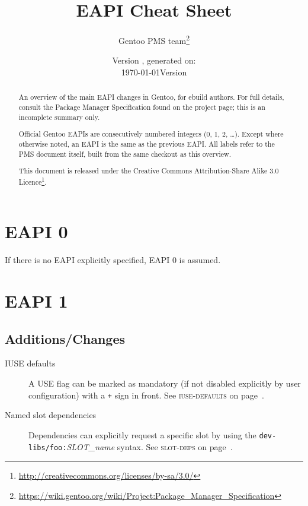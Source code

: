 \documentclass[a4paper]{leaflet}
\title{EAPI Cheat Sheet}
\author{Gentoo PMS team\thanks{%
    \url{https://wiki.gentoo.org/wiki/Project:Package_Manager_Specification}}}
\date{Version \version{}, generated on: \\\today}
\date{Version \version\\\printdate{\VCDateISO}}
\newcommand{\code}[1]{\texttt{#1}}
\newcommand{\featureref}[1]{\textsc{#1} on page~\pageref{feat:#1}}
\begin{document}
\maketitle
\thispagestyle{empty}
\begin{abstract}
    An overview of the main EAPI changes in Gentoo, for ebuild
    authors.  For full details, consult the Package Manager
    Specification found on the project page; this is
    an incomplete summary only.

    Official Gentoo EAPIs are consecutively numbered integers (0, 1,
    2, \dots).  Except where otherwise noted, an EAPI is the same as
    the previous EAPI\@.  All labels refer to the PMS document itself,
    built from the same checkout as this overview.


    This document is released under the Creative Commons
    Attribution-Share Alike 3.0
    Licence\footnote{\url{http://creativecommons.org/licenses/by-sa/3.0/}}.
\end{abstract}
\section{EAPI 0}
\label{sec:cs:eapi0}
If there is no EAPI explicitly specified, EAPI 0 is assumed.

\section{EAPI 1}
\label{sec:cs:eapi1}
\subsection{Additions/Changes}
\label{sec:cs:eapi1-additions}
\begin{description}
    \item[IUSE defaults] A USE flag can be marked as mandatory (if
    not disabled explicitly by user configuration) with a \code{+}
    sign in front.  See \featureref{iuse-defaults}.
    \item[Named slot dependencies] Dependencies can explicitly request
    a specific slot by using the
    \code{dev-libs/foo:}\allowbreak\emph{SLOT\_name} syntax.
    See \featureref{slot-deps}.
\end{description}
\end{document}
